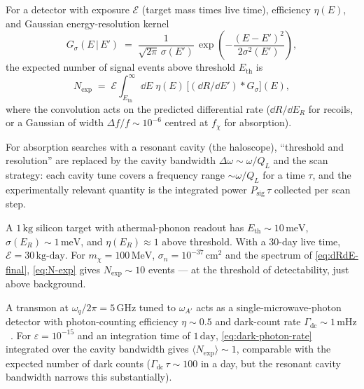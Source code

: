 \begin{statement}
\label{stmt:N-exp}
For a detector with exposure $\mathcal E$ (target mass times live
time), efficiency $\eta(E)$, and Gaussian energy-resolution kernel
\begin{equation}
G_\sigma(E\,|\,E') \;=\; \frac{1}{\sqrt{2\pi}\,\sigma(E')}\,
\exp\!\left(-\frac{(E-E')^2}{2\sigma^2(E')}\right),
\end{equation}
the expected number of signal events above threshold $E_\text{th}$
is
\begin{equation}
\label{eq:N-exp}
N_\text{exp} \;=\; \mathcal E \int_{E_\text{th}}^\infty\!\!\dd E\;
\eta(E)\,\bigl[(\dd R/\dd E')\!\ast\!G_\sigma\bigr](E),
\end{equation}
where the convolution acts on the predicted differential rate
($\dd R/\dd E_R$ for recoils, or a Gaussian of width
$\Delta f/f\sim 10^{-6}$ centred at $f_\chi$ for absorption).
\end{statement}

\begin{remark}
For absorption searches with a resonant cavity (the haloscope),
``threshold and resolution'' are replaced by the cavity
bandwidth $\Delta\omega\sim\omega/Q_L$ and the scan strategy: each
cavity tune covers a frequency range $\sim\omega/Q_L$ for a time
$\tau$, and the experimentally relevant quantity is the integrated
power $P_\text{sig}\,\tau$ collected per scan step.
\end{remark}

\begin{example}
\label{ex:phonon-detector}
A $1\,\text{kg}$ silicon target with athermal-phonon readout has
$E_\text{th}\sim 10\,\text{meV}$, $\sigma(E_R)\sim 1\,\text{meV}$,
and $\eta(E_R)\approx 1$ above threshold. With a $30$-day live
time, $\mathcal E=30\,\text{kg-day}$. For
$m_\chi=100\,\text{MeV}$, $\sigma_n=10^{-37}\,\text{cm}^2$ and the
spectrum of \cref{eq:dRdE-final}, \cref{eq:N-exp} gives
$N_\text{exp}\sim 10$ events --- at the threshold of detectability,
just above background.
\end{example}

\begin{example}
\label{ex:transmon-counter}
A transmon at $\omega_q/2\pi=5\,\text{GHz}$ tuned to $\omega_{A'}$
acts as a single-microwave-photon detector with photon-counting
efficiency $\eta\sim 0.5$ and dark-count rate
$\Gamma_\text{dc}\sim 1\,\text{mHz}$~\cite{dixit2021}. For
$\varepsilon=10^{-15}$ and an integration time of $1\,\text{day}$,
\cref{eq:dark-photon-rate} integrated over the cavity bandwidth
gives $\langle N_\text{exp}\rangle\sim 1$, comparable with the
expected number of dark counts ($\Gamma_\text{dc}\,\tau\sim 100$
in a day, but the resonant cavity bandwidth narrows this
substantially).
\end{example}

